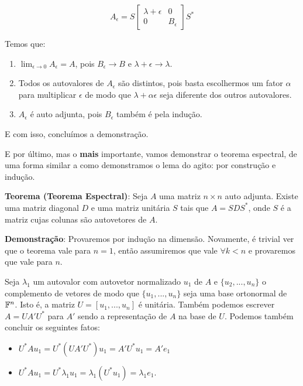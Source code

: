 \documentclass[11pt, a4paper]{article}
\begin{document}
\void[-0.7]

\[
A_{\epsilon}=S
\begin{bmatrix}
    \lambda+\epsilon & 0\\
    0 & B_{\epsilon}
\end{bmatrix}
S^*
\]

\void[-0.3]

Temos que:

\begin{enumerate}
    \item \(\displaystyle\lim_{\epsilon \rightarrow 0}{A_{\epsilon}}=A\), pois \(B_\epsilon \rightarrow B\) e \(\lambda+\epsilon \rightarrow \lambda\).
    \item Todos os autovalores de \(A_{\epsilon}\) são distintos, pois basta escolhermos um fator \(\alpha\) para multiplicar \(\epsilon\) de modo que \(\lambda+\alpha\epsilon\) seja diferente dos outros autovalores.
    \item \(A_\epsilon\) é auto adjunta, pois \(B_\epsilon\) também é pela indução.
\end{enumerate}

E com isso, concluímos a demonstração.

\void[0.5]

E por último, mas o \textbf{mais} importante, vamos demonstrar o teorema espectral, de uma forma similar a como demonstramos o lema do agito: por construção e indução.

\textbf{Teorema (Teorema Espectral)}: Seja \(A\) uma matriz \(n \times n\) auto adjunta. Existe uma matriz diagonal \(D\) e uma matriz unitária \(S\) tais que \(A=SDS^*\), onde \(S\) é a matriz cujas colunas são autovetores de \(A\).

\textbf{Demonstração}: Provaremos por indução na dimensão. Novamente, é trivial ver que o teorema vale para \(n=1\), então assumiremos que vale \(\forall k<n\) e provaremos que vale para \(n\).

Seja \(\lambda_1\) um autovalor com autovetor normalizado \(u_1\) de \(A\) e \(\{u_2,...,u_n\}\) o complemento de vetores de modo que \(\{u_1,...,u_n\}\) seja uma base ortonormal de \(\mathbb{F}^n\). Isto é, a matriz \(U=[u_1,...,u_n]\) é unitária. Também podemos escrever \(A=UA'U^*\) para \(A'\) sendo a representação de \(A\) na base de \(U\). Podemos também concluir os seguintes fatos:

\begin{itemize}
    \item \(U^*Au_1=U^*(UA'U^*)u_1=A'U^*u_1=A'e_1\)
    \item \(U^*Au_1=U^*\lambda_1u_1=\lambda_1(U^*u_1)=\lambda_1e_1\).
\end{itemize}
\end{document}
